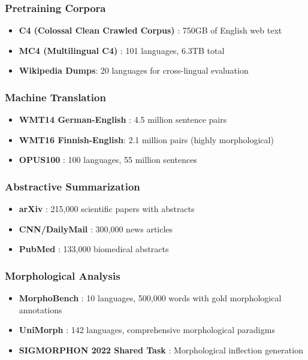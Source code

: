 \documentclass[conference]{IEEEtran}
\begin{document}
\subsubsection{Pretraining Corpora}
\begin{itemize}
    \item \textbf{C4 (Colossal Clean Crawled Corpus)} \cite{raffel2020exploring}: 750GB of English web text
    \item \textbf{MC4 (Multilingual C4)} \cite{xue2021mt5}: 101 languages, 6.3TB total
    \item \textbf{Wikipedia Dumps}: 20 languages for cross-lingual evaluation
\end{itemize}

\subsubsection{Machine Translation}
\begin{itemize}
    \item \textbf{WMT14 German-English} \cite{bojar2014findings}: 4.5 million sentence pairs
    \item \textbf{WMT16 Finnish-English}: 2.1 million pairs (highly morphological)
    \item \textbf{OPUS100} \cite{zhang2020improving}: 100 languages, 55 million sentences
\end{itemize}

\subsubsection{Abstractive Summarization}
\begin{itemize}
    \item \textbf{arXiv} \cite{cohan2018discourse}: 215,000 scientific papers with abstracts
    \item \textbf{CNN/DailyMail} \cite{see2017get}: 300,000 news articles
    \item \textbf{PubMed} \cite{jin2018hierarchical}: 133,000 biomedical abstracts
\end{itemize}

\subsubsection{Morphological Analysis}
\begin{itemize}
    \item \textbf{MorphoBench} \cite{mccarthy2022morphobench}: 10 languages, 500,000 words with gold morphological annotations
    \item \textbf{UniMorph} \cite{kirov2018unimorph}: 142 languages, comprehensive morphological paradigms
    \item \textbf{SIGMORPHON 2022 Shared Task} \cite{pimentel2022sigmorphon}: Morphological inflection generation
\end{itemize}
\end{document}
